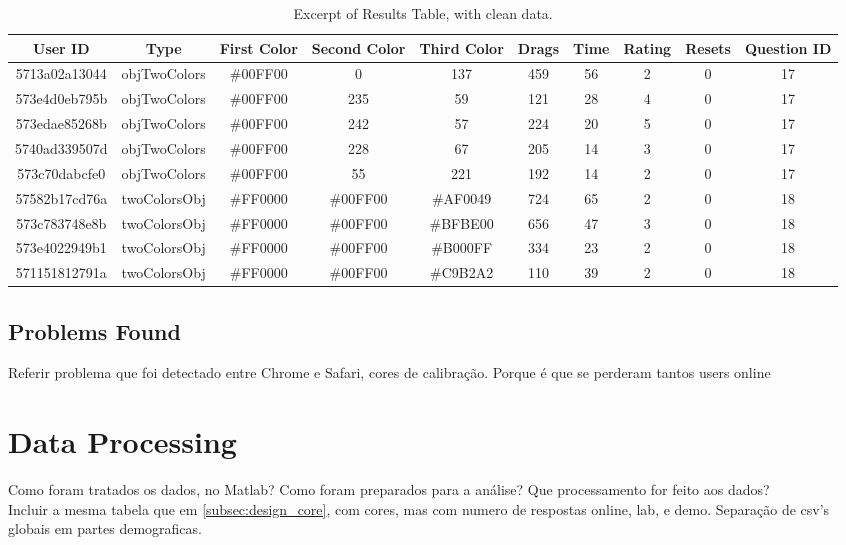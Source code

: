 \begin{table}[htbp]
  \resizebox{\textwidth}{!} {
  \begin{tabular} {|c|c|c|c|c|c|c|c|c|c|}
    \hline
    User ID & Type & First Color & Second Color & Third Color & Drags & Time & Rating & Resets & Question ID \\ \hline
    5713a02a13044 & objTwoColors & \#00FF00 & 0 & 137 & 459 & 56 & 2 & 0 & 17 \\ \hline
    573e4d0eb795b & objTwoColors & \#00FF00 & 235 & 59 & 121 & 28 & 4 & 0 & 17 \\ \hline
    573edae85268b & objTwoColors & \#00FF00 & 242 & 57 & 224 & 20 & 5 & 0 & 17 \\ \hline
    5740ad339507d & objTwoColors & \#00FF00 & 228 & 67 & 205 & 14 & 3 & 0 & 17 \\ \hline
    573c70dabcfe0 & objTwoColors & \#00FF00 & 55 & 221 & 192 & 14 & 2 & 0 & 17 \\ \hline
    57582b17cd76a & twoColorsObj & \#FF0000 & \#00FF00 & \#AF0049 & 724 & 65 & 2 & 0 & 18 \\ \hline
    573c783748e8b & twoColorsObj & \#FF0000 & \#00FF00 & \#BFBE00 & 656 & 47 & 3 & 0 & 18 \\ \hline
    573e4022949b1 & twoColorsObj & \#FF0000 & \#00FF00 & \#B000FF & 334 & 23 & 2 & 0 & 18 \\ \hline
    571151812791a & twoColorsObj & \#FF0000 & \#00FF00 & \#C9B2A2 & 110 & 39 & 2 & 0 & 18 \\ \hline
    \hline
  \end{tabular}}
  \caption[Excerpt of Clean "Results" Table]{Excerpt of Results Table, with clean data.}
  \label{table:csv_resultsclean}
\end{table}
%
\subsection{Problems Found}
\label{subsec:results_cleaningproblems}
Referir problema que foi detectado entre Chrome e Safari, cores de calibração.
Porque é que se perderam tantos users online
%
\section{Data Processing}
\label{sec:results_digest}
%
Como foram tratados os dados, no Matlab? Como foram preparados para a análise?
Que processamento for feito aos dados? \\
Incluir a mesma tabela que em \ref{subsec:design_core}, com cores, mas com numero de respostas online, lab, e demo.
Separação de csv's globais em partes demograficas.
%
